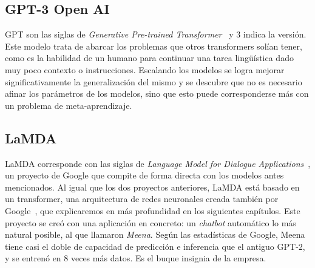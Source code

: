 \subsection{GPT-3 Open AI}
GPT son las siglas de \textit{Generative Pre-trained Transformer}~\cite{GPT3openAI2020} y 3 indica la versión. Este modelo trata de abarcar los problemas que otros transformers solían tener, como es la habilidad de un humano para continuar una tarea lingüística dado muy poco contexto o instrucciones. Escalando los modelos se logra mejorar significativamente la generalización del mismo y se descubre que no es necesario afinar los parámetros de los modelos, sino que esto puede corresponderse más con un problema de meta-aprendizaje.



\subsection{LaMDA}
LaMDA corresponde con las siglas de \textit{Language Model for Dialogue Applications}~\cite{LaMDAGoogle2020}, un proyecto de Google que compite de forma directa con los modelos antes mencionados. Al igual que los dos proyectos anteriores, LaMDA está basado en un transformer, una arquitectura de redes neuronales creada también por Google~\cite{TransformerAshish2017}, que explicaremos en más profundidad en los siguientes capítulos. Este proyecto se creó con una aplicación en concreto: un \textit{chatbot} automático lo más natural posible, al que llamaron \textit{Meena}. Según las estadísticas de Google, Meena tiene casi el doble de capacidad de predicción e inferencia que el antiguo GPT-2, y se entrenó en 8 veces más datos. Es el buque insignia de la empresa.


